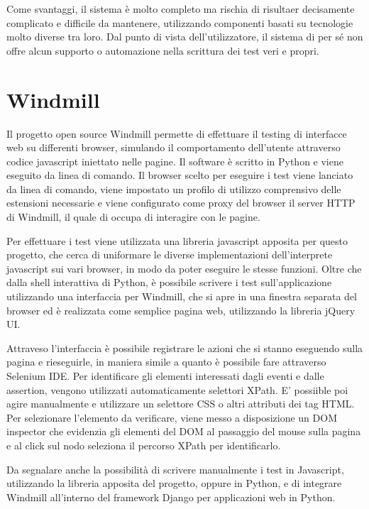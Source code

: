 Come svantaggi, il sistema è molto completo ma rischia di risultaer decisamente complicato e difficile da mantenere, utilizzando componenti basati su tecnologie molto diverse tra loro. Dal punto di vista dell'utilizzatore, il sistema di per sé non offre alcun supporto o automazione nella scrittura dei test veri e propri. 

\section{Windmill}

Il progetto open source Windmill permette di effettuare il testing di interfacce web su differenti browser, simulando il comportamento dell'utente attraverso codice javascript iniettato nelle pagine. Il software è scritto in Python e viene eseguito da linea di comando. Il browser scelto per eseguire i test viene lanciato da linea di comando, viene impostato un profilo di utilizzo comprensivo delle estensioni necessarie e viene configurato come proxy del browser il server HTTP di Windmill, il quale di occupa di interagire con le pagine. 

Per effettuare i test viene utilizzata una libreria javascript apposita per questo progetto, che cerca di uniformare le diverse implementazioni dell'interprete javascript sui vari browser, in modo da poter eseguire le stesse funzioni. 
Oltre che dalla shell interattiva di Python, è possibile scrivere i test sull'applicazione utilizzando una interfaccia per Windmill, che si apre in una finestra separata del browser ed è realizzata come semplice pagina web, utilizzando la libreria jQuery UI. 

Attraveso l'interfaccia è possibile registrare le azioni che si stanno eseguendo sulla pagina e rieseguirle, in maniera simile a quanto è possibile fare attraverso Selenium IDE. Per identificare gli elementi interessati dagli eventi e dalle assertion, vengono utilizzati automaticamente selettori XPath. E' possiible poi agire manualmente e utilizzare un selettore CSS o altri attributi dei tag HTML. Per selezionare l'elemento da verificare, viene messo a disposizione un DOM inspector che evidenzia gli elementi del DOM al passaggio del mouse sulla pagina e al click sul nodo seleziona il percorso XPath per identificarlo.

Da segnalare anche la possibilità di scrivere manualmente i test in Javascript, utilizzando la libreria apposita del progetto, oppure in Python, e di integrare Windmill all'interno del framework Django per applicazioni web in Python.

